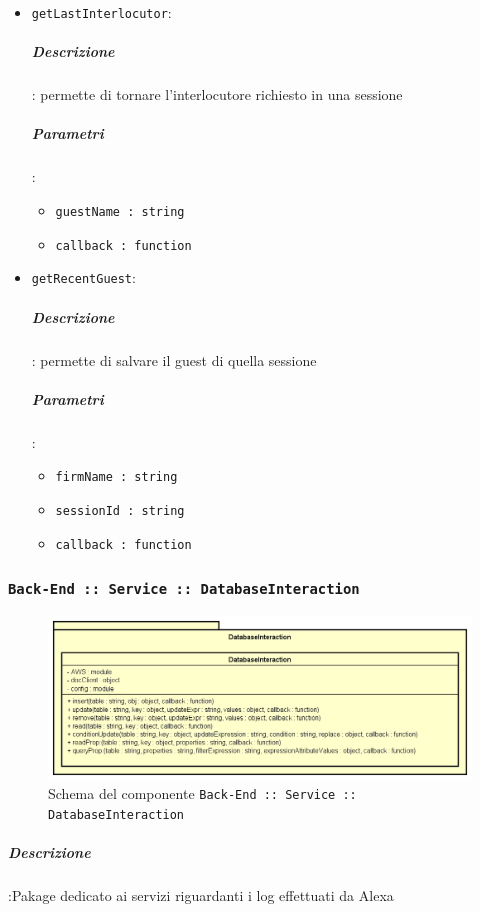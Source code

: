 \documentclass[../DefinizioneDiProdotto_v3.0.0.tex]{subfiles}
\begin{document}
\begin{itemize}
\begin{itemize}
	\end{itemize}
\item \texttt{getLastInterlocutor}:
	\subparagraph{Descrizione}: permette di tornare l'interlocutore richiesto in una sessione
	\subparagraph{Parametri}:
	\begin{itemize}
		\item \texttt{guestName : string}
		\item \texttt{callback : function}

	\end{itemize}

\item \texttt{getRecentGuest}:
	\subparagraph{Descrizione}: permette di salvare il guest di quella sessione
	\subparagraph{Parametri}:
	\begin{itemize}
		\item \texttt{firmName : string}
		\item \texttt{sessionId : string}
		\item \texttt{callback : function}
	\end{itemize}


\end{itemize}

\newpage
\subsubsection{\texttt{Back-End :: Service :: DatabaseInteraction}}
\begin{figure}[!h]
	\centering
	\includegraphics[width=\textwidth]{Architettura/Back-End/Service/DatabaseInteraction.png}
	\caption{Schema del componente \texttt{Back-End :: Service :: DatabaseInteraction}}
\end{figure}

\subparagraph{Descrizione}:Pakage dedicato ai servizi riguardanti i log effettuati da Alexa
\end{document}
